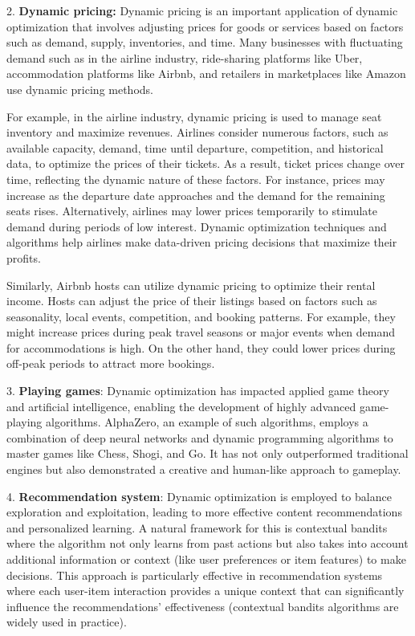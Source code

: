 \documentclass[letter,11pt]{article}
\begin{document}
2. \textbf{Dynamic pricing:} Dynamic pricing is an important application of dynamic optimization that involves adjusting prices for goods or services based on factors such as demand, supply, inventories, and time. Many businesses with fluctuating demand  such as in the airline industry, ride-sharing platforms like Uber, accommodation platforms like Airbnb, and retailers in marketplaces like Amazon use dynamic pricing methods. 

For example, in the airline industry, dynamic pricing is used to manage seat inventory and maximize revenues. Airlines consider numerous factors, such as available capacity, demand, time until departure, competition, and historical data, to optimize the prices of their tickets. As a result, ticket prices change over time, reflecting the dynamic nature of these factors. For instance, prices may increase as the departure date approaches and the demand for the remaining seats rises. Alternatively, airlines may lower prices temporarily to stimulate demand during periods of low interest. Dynamic optimization techniques and algorithms help airlines make data-driven pricing decisions that maximize their profits.

Similarly, Airbnb hosts can utilize dynamic pricing to optimize their rental income. Hosts can adjust the price of their listings based on factors such as seasonality, local events, competition, and booking patterns. For example, they might increase prices during peak travel seasons or major events when demand for accommodations is high. On the other hand, they could lower prices during off-peak periods to attract more bookings. 


3. \textbf{Playing games}: Dynamic optimization has impacted applied game theory and artificial intelligence, enabling the development of highly advanced game-playing algorithms. AlphaZero, an example of such algorithms, employs a combination of deep neural networks and dynamic programming algorithms to master games like Chess, Shogi, and Go. It has not only outperformed traditional engines but also demonstrated a creative and human-like approach to gameplay.

4. \textbf{Recommendation system}: Dynamic optimization is employed to balance exploration and exploitation, leading to more effective content recommendations and personalized learning. A natural framework for this is contextual bandits where the algorithm not only learns from past actions but also takes into account additional information or context (like user preferences or item features) to make decisions. This approach is particularly effective in recommendation systems where each user-item interaction provides a unique context that can significantly influence the recommendations' effectiveness (contextual bandits algorithms are widely used in practice).
\end{document}

